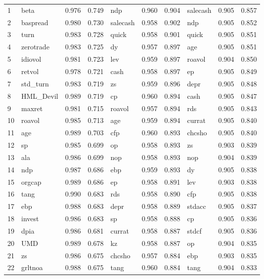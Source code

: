 \documentclass[12pt]{article}
\begin{document}
\begin{landscape}
\begin{footnotesize}
\begin{longtable}{l|lcc|lcc|lcc}
		1 & beta & 0.976 & 0.749 & ndp & 0.960 & 0.904 & salecash & 0.905 & 0.857 \\ 
  2 & baspread & 0.980 & 0.730 & salecash & 0.958 & 0.902 & ndp & 0.905 & 0.852 \\ 
  3 & turn & 0.983 & 0.728 & quick & 0.958 & 0.901 & quick & 0.905 & 0.851 \\ 
  4 & zerotrade & 0.983 & 0.725 & dy & 0.957 & 0.897 & age & 0.905 & 0.851 \\ 
  5 & idiovol & 0.981 & 0.723 & lev & 0.959 & 0.897 & roavol & 0.904 & 0.850 \\ 
  6 & retvol & 0.978 & 0.721 & cash & 0.958 & 0.897 & ep & 0.905 & 0.849 \\ 
  7 & std\_turn & 0.983 & 0.719 & zs & 0.959 & 0.896 & depr & 0.905 & 0.848 \\ 
  8 & HML\_Devil & 0.989 & 0.719 & cp & 0.960 & 0.894 & cash & 0.905 & 0.847 \\ 
  9 & maxret & 0.981 & 0.715 & roavol & 0.957 & 0.894 & rds & 0.905 & 0.843 \\ 
  10 & roavol & 0.985 & 0.713 & age & 0.959 & 0.894 & currat & 0.905 & 0.840 \\ 
  11 & age & 0.989 & 0.703 & cfp & 0.960 & 0.893 & chcsho & 0.905 & 0.840 \\ 
  12 & sp & 0.985 & 0.699 & op & 0.958 & 0.893 & zs & 0.903 & 0.839 \\ 
  13 & ala & 0.986 & 0.699 & nop & 0.958 & 0.893 & nop & 0.904 & 0.839 \\ 
  14 & ndp & 0.987 & 0.686 & ebp & 0.959 & 0.893 & dy & 0.905 & 0.838 \\ 
  15 & orgcap & 0.989 & 0.686 & ep & 0.958 & 0.891 & lev & 0.903 & 0.838 \\ 
  16 & tang & 0.990 & 0.683 & rds & 0.958 & 0.890 & cfp & 0.905 & 0.838 \\ 
  17 & ebp & 0.988 & 0.683 & depr & 0.958 & 0.889 & stdacc & 0.905 & 0.837 \\ 
  18 & invest & 0.986 & 0.683 & sp & 0.958 & 0.888 & cp & 0.905 & 0.836 \\ 
  19 & dpia & 0.986 & 0.681 & currat & 0.958 & 0.887 & stdcf & 0.905 & 0.836 \\ 
  20 & UMD & 0.989 & 0.678 & kz & 0.958 & 0.887 & op & 0.904 & 0.835 \\ 
  21 & zs & 0.986 & 0.675 & chcsho & 0.957 & 0.884 & ebp & 0.903 & 0.835 \\ 
  22 & grltnoa & 0.988 & 0.675 & tang & 0.960 & 0.884 & tang & 0.904 & 0.833 \\ 

\end{longtable}
\end{footnotesize}
\end{landscape}
\end{document}
